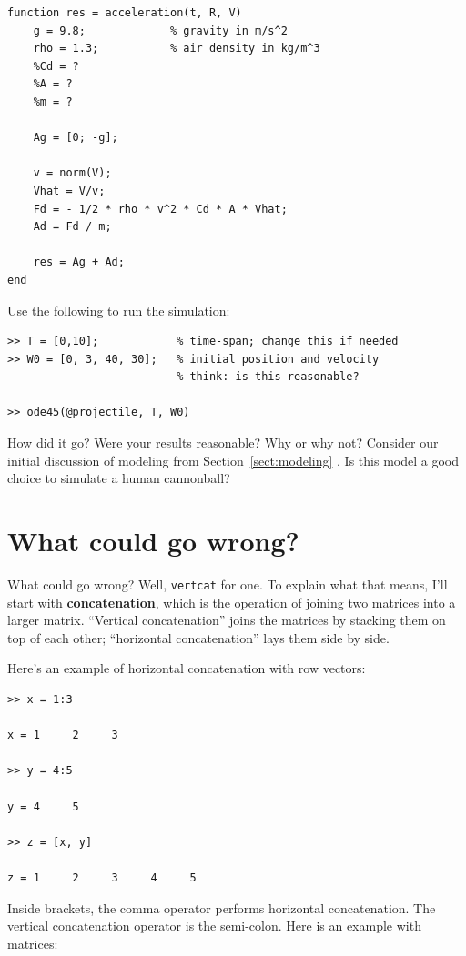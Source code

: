 \documentclass[
]{book}
\begin{document}
\begin{verbatim}
function res = acceleration(t, R, V)
    g = 9.8;             % gravity in m/s^2
    rho = 1.3;           % air density in kg/m^3
    %Cd = ?
    %A = ?
    %m = ?

    Ag = [0; -g];

    v = norm(V);
    Vhat = V/v;
    Fd = - 1/2 * rho * v^2 * Cd * A * Vhat;
    Ad = Fd / m;

    res = Ag + Ad;
end
\end{verbatim}

Use the following to run the simulation:

\begin{verbatim}
>> T = [0,10];            % time-span; change this if needed
>> W0 = [0, 3, 40, 30];   % initial position and velocity
                          % think: is this reasonable?

>> ode45(@projectile, T, W0)
\end{verbatim}

How did it go? Were your results reasonable? Why or why not? Consider our
initial discussion of modeling from Section~\ref{sect:modeling} . Is this
model a good choice to simulate a human cannonball?

\section{What could go wrong?}

What could go wrong?  Well, {\tt vertcat} for one.  To explain
what that means, I'll start with {\bf concatenation}, which is
the operation of joining two matrices into a larger matrix.
``Vertical concatenation'' joins the matrices by stacking them on
top of each other; ``horizontal concatenation'' lays them
side by side.

Here's an example of horizontal concatenation with row vectors:

\begin{verbatim}
>> x = 1:3

x = 1     2     3

>> y = 4:5

y = 4     5

>> z = [x, y]

z = 1     2     3     4     5
\end{verbatim}

Inside brackets, the comma operator performs horizontal concatenation.
The vertical concatenation operator is the semi-colon.  Here is an
example with matrices:
\end{document}
